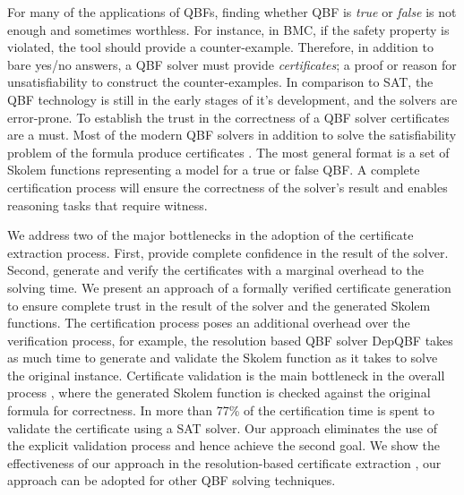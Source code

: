 \documentclass[runningheads]{llncs}
\newcommand{\0}{0}
\newcommand{\1}{1}
\begin{document}
For many of the applications of QBFs, finding whether QBF is \textit{true} or \textit{false} is not enough and sometimes worthless. For instance, in BMC, if the safety property is violated, the tool should provide a counter-example. Therefore, in addition to bare yes/no answers, a QBF solver must provide \textit{certificates}; a proof or reason for unsatisfiability to construct the counter-examples. In comparison to SAT, the QBF technology is still in the early stages of it's development, and the solvers are error-prone. To establish the trust in the correctness of a QBF solver certificates are a must. Most of the modern QBF solvers in addition to solve the satisfiability problem of the formula produce certificates \cite{Balabanov2015, RabeS16, BalabanovJ12, Benedetti05, NarizzanoPPT09, NiemetzPLSB12, JussilaBSKW07, GoultiaevaGB11, Van2013, HeuleSB17}. The most general format is a set of Skolem functions representing a model for a true or false QBF. 
A complete certification process will ensure the correctness of the solver's result and enables reasoning tasks that require witness. 

We address two of the major bottlenecks in the adoption of the certificate extraction process. First, provide complete confidence in the result of the solver. Second, generate and verify the certificates with a marginal overhead to the solving time.  We present an approach of a formally verified certificate generation to ensure complete trust in the result of the solver and the generated Skolem functions. The certification process poses an additional overhead over the verification process, for example, the resolution based QBF solver DepQBF \cite{LonsingB10} takes as much time to generate and validate the Skolem function as it takes to solve the original instance. Certificate validation is the main bottleneck in the overall process \cite{NiemetzPLSB12}, where the generated Skolem function is checked against the original formula for correctness. In \cite{NiemetzPLSB12} more than 77\% of the certification time is spent to validate the certificate using a SAT solver. Our approach eliminates the use of the explicit validation process and hence achieve the second goal. We show the effectiveness of our approach in the resolution-based certificate extraction \cite{NiemetzPLSB12}, our approach can be adopted for other QBF solving techniques.
\end{document}

